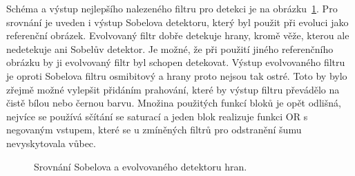 Schéma a výstup nejlepšího nalezeného filtru pro detekci je na obrázku~\ref{obrFilterSobel}. Pro srovnání je uveden i výstup Sobelova detektoru, který byl použit při evoluci jako referenční obrázek. Evolvovaný filtr dobře detekuje hrany, kromě věže, kterou ale nedetekuje ani Sobelův detektor. Je možné, že při použití jiného referenčního obrázku by ji evolvovaný filtr byl schopen detekovat. Výstup evolvovaného filtru je oproti Sobelova filtru osmibitový a hrany proto nejsou tak ostré. Toto by bylo zřejmě možné vylepšit přidáním prahování, které by výstup filtru převádělo na čistě bílou nebo černou barvu. Množina použitých funkcí bloků je opět odlišná, nejvíce se používá sčítání se saturací a jeden blok realizuje funkci OR s negovaným vstupem, které se u zmíněných filtrů pro odstranění šumu nevyskytovala vůbec.


\begin{figure}[htb]
    \centering
    \hfill
    \hfill
    \caption{Srovnání Sobelova a evolvovaného detektoru hran.}
    \label{obrFilterSobel}
\end{figure}


